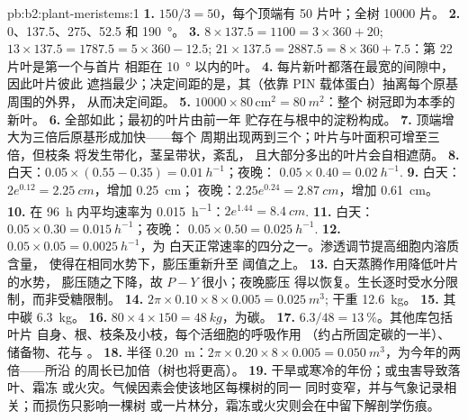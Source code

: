 \begin{solution}{pb:b2:plant-meristems:1}
\textbf{1.} $150/3 = 50$，每个顶端有 50 片叶；全树 \num{10000} 片。
\textbf{2.} 0、137.5、275、52.5 和 \qty{190}{\degree}。
\textbf{3.} $8\times 137.5 = 1100 = 3\times 360 + 20$; $13\times 137.5
= 1787.5 = 5\times 360 - 12.5$; $21\times 137.5 = 2887.5 = 8\times 360
+ 7.5$：第 22 片叶是第一个与首片
相距在 \qty{10}{\degree} 以内的叶。
\textbf{4.} 每片新叶都落在最宽的间隙中，因此叶片彼此
遮挡最少；决定间距的是，其（依靠 PIN
载体蛋白）抽离每个原基周围的外界，
从而决定间距。
\textbf{5.} $\num{10000}\times 80\,\text{cm}^{2} = \qty{80}{m^2}$：整个
树冠即为本季的新叶。
\textbf{6.} 全部如此；最初的叶片由前一年
贮存在与根中的淀粉构成。
\textbf{7.} 顶端增大为三倍后原基形成加快——每个
周期出现两到三个；叶片与叶面积可增至三倍，但枝条
将发生带化，茎呈带状，紊乱，
且大部分多出的叶片会自相遮荫。
\textbf{8.} 白天：$0.05\times(0.55 - 0.35) = \qty{0.01}{h^{-1}}$；夜晚：
$0.05\times 0.40 = \qty{0.02}{h^{-1}}$.
\textbf{9.} 白天：$2e^{0.12} = \qty{2.25}{cm}$，增加 \qty{0.25}{cm}；
夜晚：$2.25e^{0.24} = \qty{2.87}{cm}$，增加 \qty{0.61}{cm}。
\textbf{10.} 在 \qty{96}{h} 内平均速率为 \qty{0.015}{h^{-1}}：$2e^{1.44}
= \qty{8.4}{cm}$.
\textbf{11.} 白天：$0.05\times 0.30 = \qty{0.015}{h^{-1}}$；夜晚：
$0.05\times 0.50 = \qty{0.025}{h^{-1}}$.
\textbf{12.} $0.05\times 0.05 = \qty{0.0025}{h^{-1}}$，为
白天正常速率的四分之一。渗透调节提高细胞内溶质含量，
使得在相同水势下，膨压重新升至
阈值之上。
\textbf{13.} 白天蒸腾作用降低叶片的水势，
膨压随之下降，故 $P - Y$ 很小；夜晚膨压
得以恢复。生长逐时受水分限制，而非受糖限制。
\textbf{14.} $2\pi\times 0.10\times 8\times 0.005 = \qty{0.025}{m^3}$;
干重 \qty{12.6}{kg}。
\textbf{15.} 其中碳 \qty{6.3}{kg}。
\textbf{16.} $80\times 4\times 150 = \qty{48}{kg}$，为碳。
\textbf{17.} $6.3/48 = \qty{13}{\%}$。其他库包括叶片
自身、根、枝条及小枝，每个活细胞的呼吸作用
（约占所固定碳的一半）、储备物、花与
。
\textbf{18.} 半径 \qty{0.20}{m}：$2\pi\times 0.20\times 8\times
0.005 = \qty{0.050}{m^3}$，为今年的两倍——所沿
的周长已加倍（树也将更高）。
\textbf{19.} 干旱或寒冷的年份；或虫害导致落叶、霜冻
或火灾。气候因素会使该地区每棵树的同一
同时变窄，并与气象记录相关；而损伤只影响一棵树
或一片林分，霜冻或火灾则会在中留下解剖学伤痕。

\end{solution}
